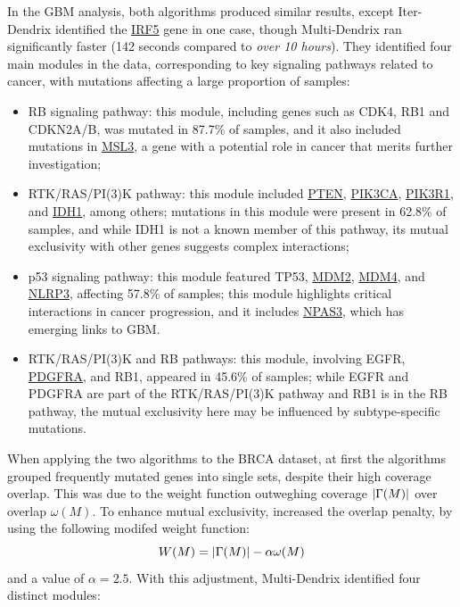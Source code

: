 In the GBM analysis, both algorithms produced similar results, except Iter-Dendrix identified the \href{https://en.wikipedia.org/wiki/IRF5}{IRF5} gene in one case, though Multi-Dendrix ran significantly faster (142 seconds compared to \textit{over 10 hours}). They identified four main modules in the data, corresponding to key signaling pathways related to cancer, with mutations affecting a large proportion of samples:

\begin{itemize}
    \item RB signaling pathway: this module, including genes such as CDK4, RB1 and CDKN2A/B, was mutated in 87.7\% of samples, and it also included mutations in \href{https://www.genecards.org/cgi-bin/carddisp.pl?gene=MSL3}{MSL3}, a gene with a potential role in cancer that merits further investigation;
    \item RTK/RAS/PI(3)K pathway: this module included \href{https://en.wikipedia.org/wiki/PTEN_(gene)}{PTEN}, \href{https://en.wikipedia.org/wiki/P110%CE%B1}{PIK3CA}, \href{https://en.wikipedia.org/wiki/PIK3R1}{PIK3R1}, and \href{https://en.wikipedia.org/wiki/IDH1}{IDH1}, among others; mutations in this module were present in 62.8\% of samples, and while IDH1 is not a known member of this pathway, its mutual exclusivity with other genes suggests complex interactions;
    \item p53 signaling pathway: this module featured TP53, \href{https://en.wikipedia.org/wiki/Mdm2}{MDM2}, \href{https://en.wikipedia.org/wiki/MDM4}{MDM4}, and \href{https://en.wikipedia.org/wiki/NLRP3}{NLRP3}, affecting 57.8\% of samples; this module highlights critical interactions in cancer progression, and it includes \href{https://en.wikipedia.org/wiki/NPAS3}{NPAS3}, which has emerging links to GBM.
    \item RTK/RAS/PI(3)K and RB pathways: this module, involving EGFR, \href{https://en.wikipedia.org/wiki/Platelet-derived_growth_factor_receptor_A}{PDGFRA}, and RB1, appeared in 45.6\% of samples; while EGFR and PDGFRA are part of the RTK/RAS/PI(3)K pathway and RB1 is in the RB pathway, the mutual exclusivity here may be influenced by subtype-specific mutations.
\end{itemize}

When applying the two algorithms to the BRCA dataset, at first the algorithms grouped frequently mutated genes into single sets, despite their high coverage overlap. This was due to the weight function outweghing coverage $\left|\Gamma(M)\right|$ over overlap $\omega(M)$. To enhance mutual exclusivity, \textcite{multi-dendrix} increased the overlap penalty, by using the following modifed weight function: $$W(M) = \left|\Gamma(M)\right| - \alpha \omega(M)$$ and a value of $\alpha = 2.5$. With this adjustment, Multi-Dendrix identified four distinct modules:

